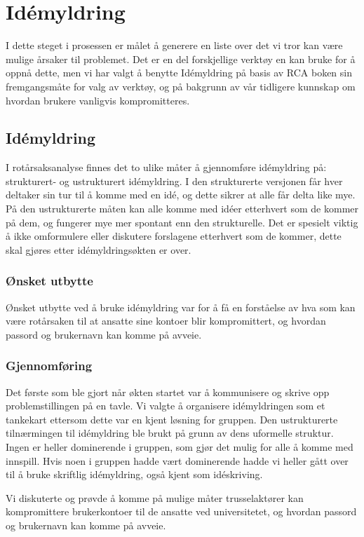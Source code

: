 \chapter{Idémyldring}
I dette steget i prosessen er målet å generere en liste over det vi tror kan være mulige årsaker til problemet. Det er en del forskjellige verktøy en kan bruke for å oppnå dette, men vi har valgt å benytte Idémyldring på basis av RCA boken \cite{RCA} sin fremgangsmåte for valg av verktøy, og på bakgrunn av vår tidligere kunnskap om hvordan brukere vanligvis kompromitteres. 

\section{Idémyldring}
I rotårsaksanalyse finnes det to ulike måter å gjennomføre idémyldring på: strukturert- og ustrukturert idémyldring. I den strukturerte versjonen får hver deltaker sin tur til å komme med en idé, og dette sikrer at alle får delta like mye. På den ustrukturerte måten kan alle komme med idéer etterhvert som de kommer på dem, og fungerer mye mer spontant enn den strukturelle. Det er spesielt viktig å ikke omformulere eller diskutere forslagene etterhvert som de kommer, dette skal gjøres etter idémyldringsøkten er over.

\subsection{Ønsket utbytte}
Ønsket utbytte ved å bruke idémyldring var for å få en forståelse av hva som kan være rotårsaken til at ansatte sine kontoer blir kompromittert, og hvordan passord og brukernavn kan komme på avveie.

\subsection{Gjennomføring}
Det første som ble gjort når økten startet var å kommunisere og skrive opp problemstillingen på en tavle. Vi valgte å organisere idémyldringen som et tankekart ettersom dette var en kjent løsning for gruppen. Den ustrukturerte tilnærmingen til idémyldring ble brukt på grunn av dens uformelle struktur. Ingen er heller dominerende i gruppen, som gjør det mulig for alle å komme med innspill. Hvis noen i gruppen hadde vært dominerende hadde vi heller gått over til å bruke skriftlig idémyldring, også kjent som idéskriving. 

Vi diskuterte og prøvde å komme på mulige måter trusselaktører kan kompromittere brukerkontoer til de ansatte ved universitetet, og hvordan passord og brukernavn kan komme på avveie.

